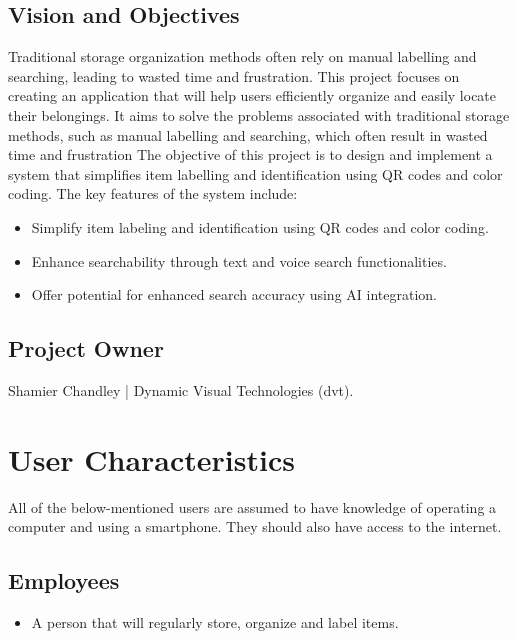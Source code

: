 \documentclass[hidelinks, 12pt, a4paper]{article}
\begin{document}
\subsection{Vision and Objectives}
Traditional storage organization methods often rely on manual labelling and searching, leading to wasted time and frustration.
\newline
This project focuses on creating an application that will help users efficiently organize and easily locate their belongings. It aims to solve the problems associated with traditional storage methods, such as manual labelling and searching, which often result in wasted time and frustration
\newline
\newline
The objective of this project is to design and implement a system that simplifies item labelling and identification using QR codes and color coding. The key features of the system include:
\begin{itemize}
    \item Simplify item labeling and identification using QR codes and color coding.
    \item Enhance searchability through text and voice search functionalities.
    \item Offer potential for enhanced search accuracy using AI integration.
\end{itemize}

\subsection{Project Owner}
Shamier Chandley | Dynamic Visual Technologies (dvt).

\pagebreak

\section{User Characteristics}
All of the below-mentioned users are assumed to have knowledge of operating a computer and using a smartphone. They should also have access to the internet.

\subsection{Employees}
\begin{itemize}
    \item A person that will regularly store, organize and label items.
\end{itemize}
\end{document}
